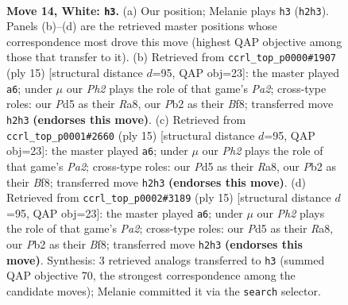 \documentclass[11pt]{article}
\begin{document}
\clearpage

\begin{figure}[p]\centering
\begin{subfigure}{0.46\textwidth}\centering
\resizebox{\linewidth}{!}{%
\newchessgame
\chessboard[
  setfen={r1bqn1k1/pppp1ppp/8/3P4/3b4/2N5/PPP2PPP/R1B1QBK1 w - - 3 14},
  showmover=false,
  pgfstyle=straightmove, color=movearrow, markmove={h2-h3}
]}
\caption{}
\end{subfigure}\hfill
\begin{subfigure}{0.46\textwidth}\centering
\resizebox{\linewidth}{!}{%
\newchessgame
\chessboard[
  setfen={r1bqkb1r/pp3ppp/5n2/2p1B3/2Pp4/NP6/P1QPPPPP/R3KB1R b KQkq - 1 8},
  showmover=false,
  pgfstyle=straightmove, color=movearrow, markmove={a7-a6}
]}
\caption{}
\end{subfigure}
\\[4pt]
\begin{subfigure}{0.46\textwidth}\centering
\resizebox{\linewidth}{!}{%
\newchessgame
\chessboard[
  setfen={r1bqkb1r/pp3ppp/5n2/2p1B3/2Pp4/NP6/P1QPPPPP/R3KB1R b KQkq - 1 8},
  showmover=false,
  pgfstyle=straightmove, color=movearrow, markmove={a7-a6}
]}
\caption{}
\end{subfigure}\hfill
\begin{subfigure}{0.46\textwidth}\centering
\resizebox{\linewidth}{!}{%
\newchessgame
\chessboard[
  setfen={r1bqkb1r/pp3ppp/5n2/2p1B3/2Pp4/NP6/P1QPPPPP/R3KB1R b KQkq - 1 8},
  showmover=false,
  pgfstyle=straightmove, color=movearrow, markmove={a7-a6}
]}
\caption{}
\end{subfigure}
\caption{\textbf{Move 14, White: \texttt{h3}.} (a) Our position; Melanie plays \texttt{h3} (\texttt{h2h3}). Panels (b)--(d) are the retrieved master positions whose correspondence most drove this move (highest QAP objective among those that transfer to it). (b) Retrieved from \texttt{ccrl\_top\_p0000\#1907} (ply 15) [structural distance $d$=95, QAP obj=23]: the master played \texttt{a6}; under $\mu$ our \emph{Ph2} plays the role of that game's \emph{Pa2}; cross-type roles: our \emph{P}d5 as their \emph{R}a8, our \emph{P}b2 as their \emph{B}f8; transferred move \texttt{h2h3} \textbf{(endorses this move)}. (c) Retrieved from \texttt{ccrl\_top\_p0001\#2660} (ply 15) [structural distance $d$=95, QAP obj=23]: the master played \texttt{a6}; under $\mu$ our \emph{Ph2} plays the role of that game's \emph{Pa2}; cross-type roles: our \emph{P}d5 as their \emph{R}a8, our \emph{P}b2 as their \emph{B}f8; transferred move \texttt{h2h3} \textbf{(endorses this move)}. (d) Retrieved from \texttt{ccrl\_top\_p0002\#3189} (ply 15) [structural distance $d$=95, QAP obj=23]: the master played \texttt{a6}; under $\mu$ our \emph{Ph2} plays the role of that game's \emph{Pa2}; cross-type roles: our \emph{P}d5 as their \emph{R}a8, our \emph{P}b2 as their \emph{B}f8; transferred move \texttt{h2h3} \textbf{(endorses this move)}. Synthesis: 3 retrieved analogs transferred to \texttt{h3} (summed QAP objective 70, the strongest correspondence among the candidate moves); Melanie committed it via the \texttt{search} selector.}
\label{fig:thought-m26}
\end{figure}
\end{document}
